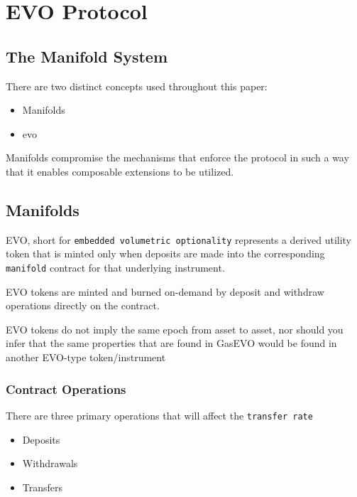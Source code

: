\chapter{EVO Protocol }\label{sec:evoprotocol}


\section{The Manifold System}

There are two distinct concepts used throughout this paper:
\begin{itemize}
    \item Manifolds
    \item evo
\end{itemize}

\label{Manifolds}Manifolds compromise the mechanisms that enforce the protocol in such a way that it enables composable extensions to be utilized. 

\section{Manifolds}\label{sec:manifolds}
EVO, short for \texttt{embedded volumetric optionality} represents a derived utility token that is minted only when deposits are made into the corresponding \texttt{manifold} contract for that underlying instrument. 

EVO tokens are minted and burned on-demand by deposit and withdraw operations directly on the contract.\linebreak

\begin{tcolorbox}
EVO tokens do not imply the same epoch from asset to asset, nor should you infer that the same properties that are found in GasEVO would be found in another EVO-type token/instrument
\end{tcolorbox}


\subsection{Contract Operations}

There are three primary operations that will affect the \texttt{transfer rate}

\begin{itemize}
  \item Deposits
  \item Withdrawals 
  \item Transfers
\end{itemize}


